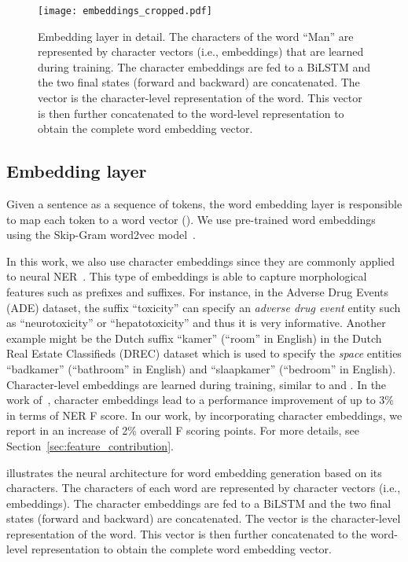 \documentclass[review]{elsarticle}
\newcommand{\ie}{i.e., }
\newcommand{\secref}[1]{Section~\ref{#1}}
\begin{document}
\begin{figure}
\centering				
\texttt{[image: embeddings\_cropped.pdf]}
				\caption{Embedding layer in detail. The characters of the word ``Man'' are represented by character vectors (\ie embeddings) that are learned during training.  
The character embeddings are fed to a BiLSTM and the two final states (forward and backward) are concatenated. The vector  is the character-level representation of the word. This vector is then further concatenated to the word-level representation  to obtain the complete word embedding vector.}
				\label{fig:embeddings}
			\end{figure}

\subsection{Embedding layer}
\label{subsec:embeddings}
\noindent Given a sentence  as a sequence of tokens, the word embedding layer is responsible to map each token to a word vector (). We use pre-trained word embeddings using the Skip-Gram word2vec model~\citep{mikolov:13}.


In this work, we also use character embeddings since they are commonly applied to neural NER~\citep{ma:16,lample:16}. This type of embeddings is able to capture morphological features such as prefixes and suffixes. For instance, in the Adverse Drug Events (ADE) dataset, the suffix
``toxicity'' can specify an \emph{adverse drug event} entity
such as ``neurotoxicity'' or ``hepatotoxicity'' and thus it is very informative. Another example might be the Dutch suffix ``kamer'' (``room'' in English) in the Dutch Real Estate Classifieds (DREC) dataset which is  used to specify the \emph{space} entities ``badkamer'' (``bathroom'' in English) and ``slaapkamer'' (``bedroom'' in English). Character-level embeddings are learned during training, similar to \cite{ma:16} and \cite{lample:16}. In the work of~\cite{lample:16}, character embeddings lead to a performance improvement of up to 3\% in terms of NER F score. In our work, by incorporating character embeddings, we report in  an increase of 2\% overall F scoring points. For more details, see \secref{sec:feature_contribution}.

 illustrates the neural architecture for word embedding generation based on its characters. The characters of each word are represented by character vectors (\ie embeddings).  
The character embeddings are fed to a BiLSTM and the two final states (forward and backward) are concatenated. The vector  is the character-level representation of the word. This vector is then further concatenated to the word-level representation  to obtain the complete word embedding vector.
\end{document}
